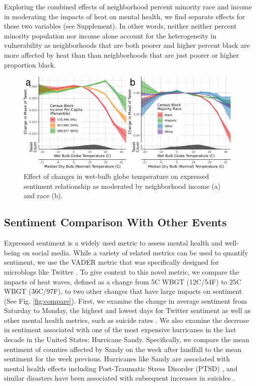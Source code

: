 \documentclass[fleqn,10pt]{wlscirep}
\begin{document}
Exploring the combined effects of neighborhood percent minority race and income in moderating the impacts of heat on mental health, we find separate effects for these two variables (see Supplement). In other words, neither neither percent minority population nor income alone account for the heterogeneity in vulnerability as neighborhoods that are both poorer and higher percent black are more affected by heat than than neighborhoods that are just poorer or higher proportion black.

\begin{figure}[H]
\centering
  \includegraphics[width=\linewidth]{../res/wbgt_combined.png}
    \caption{Effect of changes in wet-bulb globe temperature on expressed sentiment relationship as moderated by neighborhood income (a) and race (b).}
\label{fig:hetero}
\end{figure}


\subsection*{Sentiment Comparison With Other Events}
Expressed sentiment is a widely used metric to assess mental health and well-being on social media.  While a variety of related metrics can be used to quantify sentiment, we use the VADER metric that was specifically designed for microblogs like Twitter \cite{hutto2014vader}.  To give context to this novel metric, we compare the impacts of heat waves, defined as a change from 5\textdegree C WBGT (12\textdegree C/54\textdegree F) to 25\textdegree C WBGT (36\textdegree C/97\textdegree F), to two other changes that have large impacts on sentiment (See Fig. \ref{fig:compare}).  First, we examine the change in average sentiment from Saturday to Monday, the highest and lowest days for Twitter sentiment as well as other mental health metrics, such as suicide rates \cite{CDC2021}.  We also examine the decrease in sentiment associated with one of the most expensive hurricanes in the last decade in the United States: Hurricane Sandy.  Specifically, we compare the mean sentiment of counties affected by Sandy on the week after landfall to the mean sentiment for the week previous.  Hurricanes like Sandy are associated with mental health effects including Post-Traumatic Stress Disorder (PTSD) \cite{Schwartz2017Aug, Schwartz2018May}, and similar disasters have been associated with subsequent increases in suicides \cite{Krug1998Feb}.
\end{document}
